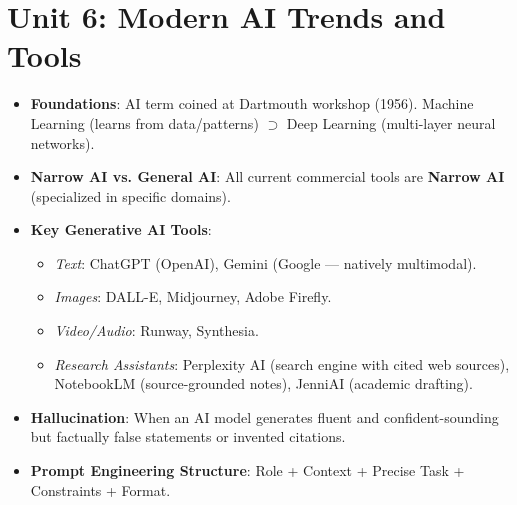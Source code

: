 \section*{Unit 6: Modern AI Trends and Tools}
\begin{itemize}[leftmargin=6mm]
    \item \textbf{Foundations}: AI term coined at Dartmouth workshop (1956). Machine Learning (learns from data/patterns) $\supset$ Deep Learning (multi-layer neural networks).
    \item \textbf{Narrow AI vs. General AI}: All current commercial tools are \textbf{Narrow AI} (specialized in specific domains).
    \item \textbf{Key Generative AI Tools}:
    \begin{itemize}
        \item \textit{Text}: ChatGPT (OpenAI), Gemini (Google --- natively multimodal).
        \item \textit{Images}: DALL-E, Midjourney, Adobe Firefly.
        \item \textit{Video/Audio}: Runway, Synthesia.
        \item \textit{Research Assistants}: Perplexity AI (search engine with cited web sources), NotebookLM (source-grounded notes), JenniAI (academic drafting).
    \end{itemize}
    \item \textbf{Hallucination}: When an AI model generates fluent and confident-sounding but factually false statements or invented citations.
    \item \textbf{Prompt Engineering Structure}: Role + Context + Precise Task + Constraints + Format.
\end{itemize}

\newpage
